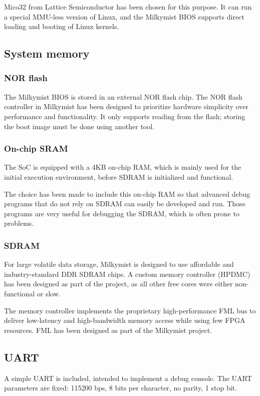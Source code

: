 \documentclass[a4paper,11pt]{article}
\begin{document}
Mico32 from Lattice Semiconductor has been chosen for this purpose. It can run a special MMU-less version of Linux, and the Milkymist BIOS supports direct loading and booting of Linux kernels.

\subsection{System memory}
\subsubsection{NOR flash}
The Milkymist BIOS is stored in an external NOR flash chip. The NOR flash controller in Milkymist has been designed to prioritize hardware simplicity over performance and functionality. It only supports reading from the flash; storing the boot image must be done using another tool.

\subsubsection{On-chip SRAM}
The SoC is equipped with a 4KB on-chip RAM, which is mainly used for the initial execution environment, before SDRAM is initialized and functional.

The choice has been made to include this on-chip RAM so that advanced debug programs that do not rely on SDRAM can easily be developed and run. Those programs are very useful for debugging the SDRAM, which is often prone to problems.

\subsubsection{SDRAM}
For large volatile data storage, Milkymist is designed to use affordable and industry-standard DDR SDRAM chips. A custom memory controller (HPDMC) has been designed as part of the project, as all other free cores were either non-functional or slow.

The memory controller implements the proprietary high-performance FML bus to deliver low-latency and high-bandwidth memory access while using few FPGA resources. FML has been designed as part of the Milkymist project.

\subsection{UART}
A simple UART is included, intended to implement a debug console. The UART parameters are fixed: 115200 bps, 8 bits per character, no parity, 1 stop bit.
\end{document}
